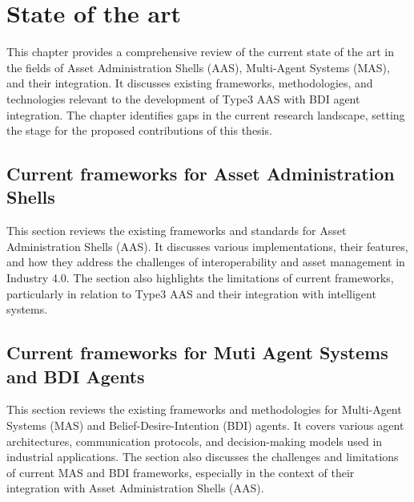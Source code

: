\section{State of the art}
\begin{tcolorbox}[colback=yellow!5!white,colframe=yellow!75!black,
  title=About this chapter]
  This chapter provides a comprehensive review of the current state of the art in the fields of Asset Administration Shells (AAS), Multi-Agent Systems (MAS), and their integration. It discusses existing frameworks, methodologies, and technologies relevant to the development of Type3 AAS with BDI agent integration. The chapter identifies gaps in the current research landscape, setting the stage for the proposed contributions of this thesis.
\end{tcolorbox}

\subsection{Current frameworks for Asset Administration Shells}
\begin{tcolorbox}[colback=yellow!5!white,colframe=yellow!75!black,
  title=About Current Frameworks for AAS]
  This section reviews the existing frameworks and standards for Asset Administration Shells (AAS). It discusses various implementations, their features, and how they address the challenges of interoperability and asset management in Industry 4.0. The section also highlights the limitations of current frameworks, particularly in relation to Type3 AAS and their integration with intelligent systems.
\end{tcolorbox}

\subsection{Current frameworks for Muti Agent Systems and BDI Agents}
\begin{tcolorbox}[colback=yellow!5!white,colframe=yellow!75!black,
  title=About Current Frameworks for MAS and BDI Agents]
  This section reviews the existing frameworks and methodologies for Multi-Agent Systems (MAS) and Belief-Desire-Intention (BDI) agents. It covers various agent architectures, communication protocols, and decision-making models used in industrial applications. The section also discusses the challenges and limitations of current MAS and BDI frameworks, especially in the context of their integration with Asset Administration Shells (AAS).
\end{tcolorbox}

